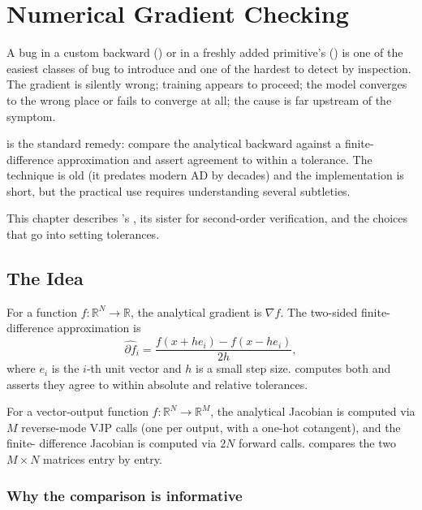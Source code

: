 \chapter{Numerical Gradient Checking}
\label{ch:gradcheck}

A bug in a custom backward () or in a
freshly added primitive's 
() is one of the easiest classes of bug to
introduce and one of the hardest to detect by inspection. The
gradient is silently wrong; training appears to proceed; the
model converges to the wrong place or fails to converge at all;
the cause is far upstream of the symptom.

 is the standard remedy: compare the analytical
backward against a finite-difference approximation and assert
agreement to within a tolerance. The technique is old (it predates
modern AD by decades) and the implementation is short, but the
practical use requires understanding several subtleties.

This chapter describes \Lucid's ,
its sister  for second-order verification, and
the choices that go into setting tolerances.

\section{The Idea}
\label{sec:gradcheck:idea}

For a function $f : \mathbb{R}^N \to \mathbb{R}$, the analytical
gradient is $\nabla f$. The two-sided finite-difference
approximation is
\[
\widehat{\partial f}_i = \frac{f(x + h e_i) - f(x - h e_i)}{2h},
\]
where $e_i$ is the $i$-th unit vector and $h$ is a small step
size.  computes both and asserts they agree to
within absolute and relative tolerances.

For a vector-output function $f : \mathbb{R}^N \to \mathbb{R}^M$,
the analytical Jacobian is computed via $M$ reverse-mode VJP calls
(one per output, with a one-hot cotangent), and the finite-
difference Jacobian is computed via $2N$ forward calls.
 compares the two $M \times N$ matrices entry by
entry.

\subsection{Why the comparison is informative}
\label{ssec:gradcheck:informative}

